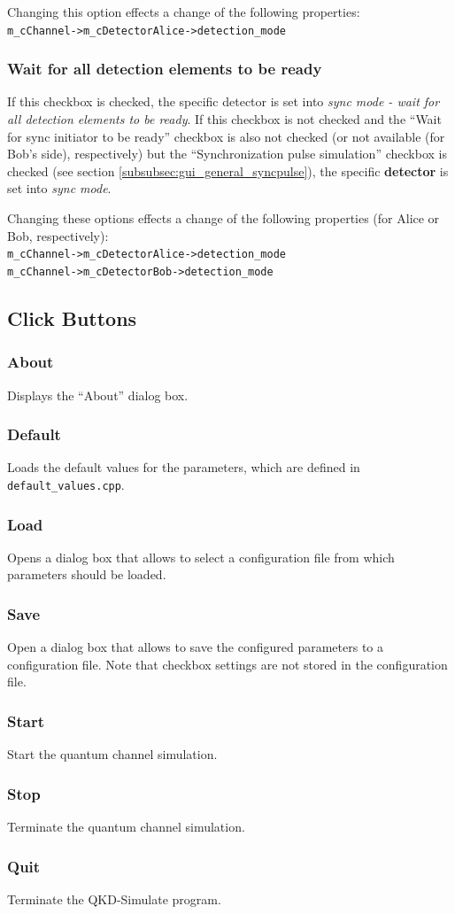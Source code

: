 Changing this option effects a change of the following properties\hyperlink{fn:modinfo}{\footnotemark[\value{fnmodinfo}]}:\\
\texttt{m\_cChannel->m\_cDetectorAlice->detection\_mode}

\subsubsection{Wait for all detection elements to be ready}
\label{subsubsec:gui_abopt_wait_for_all}
If this checkbox is checked, the specific detector is set into \textit{sync mode - wait for all detection elements to be ready}. If this checkbox is not checked and the ``Wait for sync initiator to be ready'' checkbox is also not checked (or not available (for Bob's side), respectively) but the ``Synchronization pulse simulation'' checkbox is checked (see section \ref{subsubsec:gui_general_syncpulse}), the specific \textbf{detector} is set into \textit{sync mode}.

Changing these options effects a change of the following properties (for Alice or Bob, respectively)\hyperlink{fn:modinfo}{\footnotemark[\value{fnmodinfo}]}:\\
\texttt{m\_cChannel->m\_cDetectorAlice->detection\_mode}\\
\texttt{m\_cChannel->m\_cDetectorBob->detection\_mode}

\subsection{Click Buttons}

\subsubsection{About}
Displays the ``About'' dialog box.

\subsubsection{Default}
Loads the default values for the parameters, which are defined in \texttt{default\_values.cpp}.

\subsubsection{Load}
Opens a dialog box that allows to select a configuration file from which parameters should be loaded.

\subsubsection{Save}
Open a dialog box that allows to save the configured parameters to a configuration file. Note that checkbox settings are not stored in the configuration file.

\subsubsection{Start}
Start the quantum channel simulation.

\subsubsection{Stop}
Terminate the quantum channel simulation.

\subsubsection{Quit}
Terminate the QKD-Simulate program.